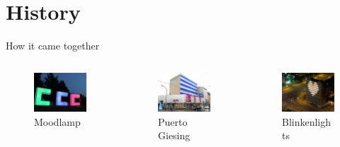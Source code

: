 \documentclass{beamer}
\begin{document}
\section{History}
\begin{frame}{How it came together}

\begin{columns}%
\begin{column}{3.5cm}
        \begin{figure}
          \begin{center}
          \includegraphics[width=3cm]{bilder/ddc_har.jpg}
          \caption{Moodlamp}
          \end{center}
        \end{figure}
\end{column}
\begin{column}{3.5cm}
        \begin{figure}
          \begin{center}
          \includegraphics[width=3cm]{bilder/hertie.jpg}
          \caption{Puerto Giesing}
          \end{center}
        \end{figure}
\end{column}
\begin{column}{3.5cm}
        \begin{figure}
          \begin{center}
          \includegraphics[width=3cm]{bilder/blinkenlights.jpg}
          \caption{Blinkenlights}

\end{center}
\end{figure}
\end{column}
\end{columns}
\end{frame}
\end{document}
